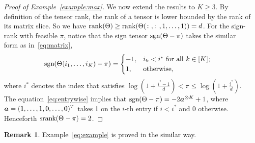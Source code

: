 \documentclass[twoside,11pt]{article}
\theoremstyle{plain}
\theoremstyle{definition}
\newtheorem{rmk}{Remark}
\def\sign{\textup{sgn}}
\def\srank{\textup{srank}}
\def\rank{\textup{rank}}
\begin{document}
\begin{proof}[Proof of Example~\ref{example:max}]
We now extend the results to $K\geq 3$. By definition of the tensor rank, the rank of a tensor is lower bounded by the rank of its matrix slice.  So we have $\rank(\Theta)\geq \rank(\Theta(\colon,\colon,1,\ldots,1))=d$. For the sign-rank with feasible $\pi$, notice that the sign tensor $\sign(\Theta-\pi)$ takes the similar form as in~\eqref{eq:matrix},
\begin{equation}\label{eq:entrywise}
\sign (\Theta(i_1,\ldots,i_K)-\pi)=
\begin{cases}
-1, & \text{$i_k<i^*$ for all $k\in[K]$};\\
1, & \text{otherwise},
\end{cases}
\end{equation}
where $i^*$ denotes the index that satisfies $\log(1+\frac{i^*-1}{d})<\pi\leq \log(1+\frac{i^*}{d})$.
The equation~\eqref{eq:entrywise} implies that $\sign(\Theta-\pi)=-2\ma^{\otimes K}+1$, where $\bm{a}=(1,\ldots,1,0,\ldots,0)^T$ takes 1 on the $i$-th entry if $i<i^*$ and 0 otherwise. Henceforth $\srank(\Theta-\pi)=2$. 
\end{proof}
\begin{rmk}
Example~\ref{eq:example} is proved in the similar way.
\end{rmk}
\end{document}
